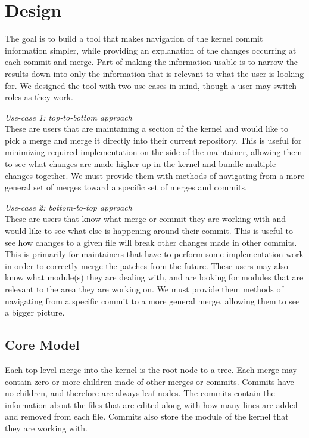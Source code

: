 \documentclass[conference, draftclsnofoot]{IEEEtran}
\begin{document}
\section{Design}
The goal is to build a tool that makes navigation of the kernel commit
information simpler, while providing an explanation of the changes occurring at
each commit and merge. Part of making the information usable is to narrow the
results down into only the information that is relevant to what the user is
looking for. We designed the tool with two use-cases in mind, though a user may
switch roles as they work.

\textit{Use-case 1: top-to-bottom approach}\\
These are users that are maintaining a section of the kernel and would like to
pick a merge and merge it directly into their current repository. This is
useful for minimizing required implementation on the side of the maintainer,
allowing them to see what changes are made higher up in the kernel and bundle
multiple changes together. We must provide them with methods of navigating from
a more general set of merges toward a specific set of merges and commits.

\textit{Use-case 2: bottom-to-top approach}\\
These are users that know what merge or commit they are working with and would
like to see what else is happening around their commit. This is useful to see
how changes to a given file will break other changes made in other commits.
This is primarily for maintainers that have to perform some implementation work
in order to correctly merge the patches from the future. These users may also
know what module(s) they are dealing with, and are looking for modules that are
relevant to the area they are working on. We must provide them methods of
navigating from a specific commit to a more general merge, allowing them to see
a bigger picture.

\subsection{Core Model}
Each top-level merge into the kernel is the root-node to a tree. Each merge
may contain zero or more children made of other merges or commits. Commits have
no children, and therefore are always leaf nodes.  The commits contain the
information about the files that are edited along with how many lines are added
and removed from each file. Commits also store the module of the kernel that
they are working with.
\end{document}

